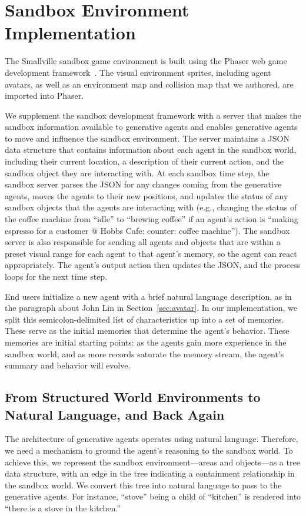 \section{Sandbox Environment Implementation}\label{sec:implementation}
The Smallville sandbox game environment is built using the Phaser web game development framework~\cite{72_Phaser}. The visual environment sprites, including agent avatars, as well as an environment map and collision map that we authored, are imported into Phaser.

We supplement the sandbox development framework with a server that makes the sandbox information available to generative agents and enables generative agents to move and influence the sandbox environment. The server maintains a JSON data structure that contains information about each agent in the sandbox world, including their current location, a description of their current action, and the sandbox object they are interacting with. At each sandbox time step, the sandbox server parses the JSON for any changes coming from the generative agents, moves the agents to their new positions, and updates the status of any sandbox objects that the agents are interacting with (e.g., changing the status of the coffee machine from ``idle'' to ``brewing coffee'' if an agent's action is ``making espresso for a customer @ Hobbs Cafe: counter: coffee machine''). The sandbox server is also responsible for sending all agents and objects that are within a preset visual range for each agent to that agent's memory, so the agent can react appropriately. The agent's output action then updates the JSON, and the process loops for the next time step.

End users initialize a new agent with a brief natural language description, as in the paragraph about John Lin in Section~\ref{sec:avatar}. In our implementation, we split this semicolon-delimited list of characteristics up into a set of memories. These serve as the initial memories that determine the agent's behavior.
These memories are initial starting points: as the agents gain more experience in the sandbox world, and as more records saturate the memory stream, the agent's summary and behavior will evolve. 

\subsection{From Structured World Environments to Natural Language, and Back Again} 
The architecture of generative agents operates using natural language. Therefore, we need a mechanism to ground the agent's reasoning to the sandbox world. To achieve this, we represent the sandbox environment---areas and objects---as a tree data structure, with an edge in the tree indicating a containment relationship in the sandbox world. We convert this tree into natural language to pass to the generative agents. For instance, ``stove'' being a child of ``kitchen'' is rendered into ``there is a stove in the kitchen.''

